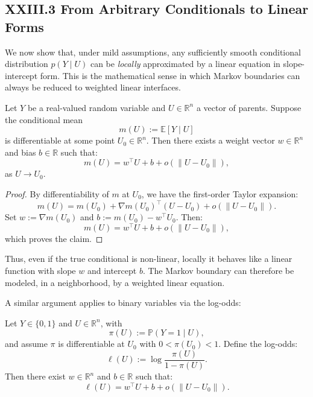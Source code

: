 \documentclass[12pt,letterpaper]{article}
\begin{document}
\subsection{XXIII.3 From Arbitrary Conditionals to Linear Forms}

We now show that, under mild assumptions, any sufficiently smooth conditional distribution $p(Y \mid U)$ can be \emph{locally} approximated by a linear equation in slope-intercept form. This is the mathematical sense in which Markov boundaries can always be reduced to weighted linear interfaces.

\begin{lemma}
Let $Y$ be a real-valued random variable and $U \in \mathbb{R}^n$ a vector of parents. Suppose the conditional mean
\[
m(U) := \mathbb{E}[Y \mid U]
\]
is differentiable at some point $U_0 \in \mathbb{R}^n$. Then there exists a weight vector $w \in \mathbb{R}^n$ and bias $b \in \mathbb{R}$ such that:
\[
m(U) = w^\top U + b + o(\|U - U_0\|),
\]
as $U \to U_0$.
\end{lemma}

\begin{proof}
By differentiability of $m$ at $U_0$, we have the first-order Taylor expansion:
\[
m(U) = m(U_0) + \nabla m(U_0)^\top (U - U_0) + o(\|U - U_0\|).
\]
Set $w := \nabla m(U_0)$ and $b := m(U_0) - w^\top U_0$. Then:
\[
m(U) = w^\top U + b + o(\|U - U_0\|),
\]
which proves the claim.
\end{proof}

Thus, even if the true conditional is non-linear, locally it behaves like a linear function with slope $w$ and intercept $b$. The Markov boundary can therefore be modeled, in a neighborhood, by a weighted linear equation.

A similar argument applies to binary variables via the log-odds:

\begin{lemma}
Let $Y \in \{0,1\}$ and $U \in \mathbb{R}^n$, with
\[
\pi(U) := \mathbb{P}(Y=1 \mid U),
\]
and assume $\pi$ is differentiable at $U_0$ with $0 < \pi(U_0) < 1$. Define the log-odds:
\[
\ell(U) := \log \frac{\pi(U)}{1-\pi(U)}.
\]
Then there exist $w \in \mathbb{R}^n$ and $b \in \mathbb{R}$ such that:
\[
\ell(U) = w^\top U + b + o(\|U - U_0\|).
\]
\end{lemma}
\end{document}
